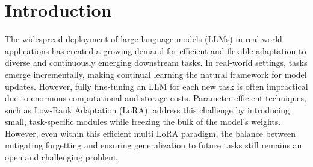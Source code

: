 \documentclass[letterpaper]{article} %
\begin{document}
\begin{abstract}
\end{abstract}



\section{Introduction}



The widespread deployment of large language models (LLMs) in real-world applications has created a growing demand for efficient and flexible adaptation to diverse and continuously emerging downstream tasks. In real‐world settings, tasks emerge incrementally, making continual learning the natural framework for model updates. However, fully fine‐tuning an LLM for each new task is often impractical due to enormous computational and storage costs. Parameter‐efficient techniques, such as Low‐Rank Adaptation (LoRA), address this challenge by introducing small, task‐specific modules while freezing the bulk of the model’s weights. However, even within this efficient multi LoRA paradigm, the balance between mitigating forgetting and ensuring generalization to future tasks still remains an open and challenging problem.
\end{document}
